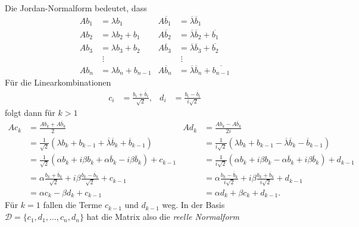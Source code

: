 Die Jordan-Normalform bedeutet, dass
\[
\begin{aligned}
Ab_1&=\lambda b_1           &
	A\overline{b}_1 &= \overline{\lambda} \overline{b}_1      \\
Ab_2&=\lambda b_2 + b_1     &
	A\overline{b}_2 &= \overline{\lambda} \overline{b}_2 +\overline{b_1}\\
Ab_3&=\lambda b_3 + b_2     &
	A\overline{b}_3 &= \overline{\lambda} \overline{b}_3 +\overline{b_2}\\
    &\;\vdots               &
	                 &\;\vdots \\
Ab_n&=\lambda b_n + b_{n-1} &
	A\overline{b}_n &= \overline{\lambda} \overline{b}_n +\overline{b_{n-1}}
\end{aligned}
\]
Für die Linearkombinationen
\begin{equation}
\begin{aligned}
c_i &= \frac{b_i+\overline{b}_i}{\sqrt{2}},
&
d_i &= \frac{b_i-\overline{b}_i}{i\sqrt{2}}
\end{aligned}
\label{buch:eigenwerte:eqn:reellenormalformumrechnung}
\end{equation}
folgt dann für $k>1$
\begin{align*}
Ac_k
&=
\frac{Ab_k+A\overline{b}_k}{2}
&
Ad_k
&=
\frac{Ab_k-A\overline{b}_k}{2i}
\\
&=
\frac1{\sqrt{2}}(\lambda b_k + b_{k-1}
+ \overline{\lambda}\overline{b}_k + \overline{b}_{k-1})
&
&=
\frac1{i\sqrt{2}}(\lambda b_k + b_{k-1}
- \overline{\lambda}\overline{b}_k - \overline{b}_{k-1})
\\
&=
\frac1{\sqrt{2}}(\alpha b_k + i\beta b_k + \alpha \overline{b}_k -i\beta \overline{b}_k)
+
c_{k-1}
&
&=
\frac1{i\sqrt{2}}(
\alpha b_k + i\beta b_k - \alpha \overline{b}_k +i\beta \overline{b}_k)
+
d_{k-1}
\\
&=
\alpha
\frac{b_k+\overline{b}_k}{\sqrt{2}}
+
i \beta \frac{b_k-\overline{b}_k}{\sqrt{2}}
+
c_{k-1}
&
&=
\alpha
\frac{b_k-\overline{b}_k}{i\sqrt{2}}
+
i \beta \frac{b_k+\overline{b}_k}{i\sqrt{2}}
+
d_{k-1}
\\
&= \alpha c_k -\beta d_k
+
c_{k-1}
&
&= \alpha d_k + \beta c_k
+
d_{k-1}.
\end{align*}
Für $k=1$ fallen die Terme $c_{k-1}$ und $d_{k-1}$ weg.
In der Basis $\mathcal{D}=\{c_1,d_1,\dots,c_n,d_n\}$ hat die Matrix
also die {\em reelle Normalform}
%
%

